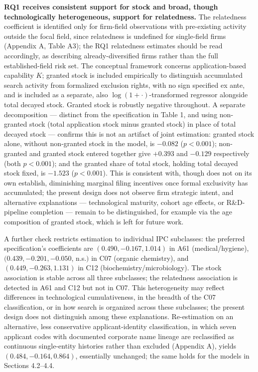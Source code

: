 \documentclass[12pt]{article}
\begin{document}
\textbf{RQ1 receives consistent support for stock and broad, though technologically heterogeneous, support for relatedness.} The relatedness coefficient is identified only for firm-field observations with pre-existing activity outside the focal field, since relatedness is undefined for single-field firms (Appendix A, Table A3); the RQ1 relatedness estimates should be read accordingly, as describing already-diversified firms rather than the full established-field risk set. The conceptual framework concerns application-based capability $K$; granted stock is included empirically to distinguish accumulated search activity from formalized exclusion rights, with no sign specified ex ante, and is included as a separate, also $\log(1+\cdot)$-transformed regressor alongside total decayed stock. Granted stock is robustly negative throughout. A separate decomposition --- distinct from the specification in Table 1, and using non-granted stock (total application stock minus granted stock) in place of total decayed stock --- confirms this is not an artifact of joint estimation: granted stock alone, without non-granted stock in the model, is $-0.082$ ($p<0.001$); non-granted and granted stock entered together give $+0.393$ and $-0.129$ respectively (both $p<0.001$); and the granted share of total stock, holding total decayed stock fixed, is $-1.523$ ($p<0.001$). This is consistent with, though does not on its own establish, diminishing marginal filing incentives once formal exclusivity has accumulated; the present design does not observe firm strategic intent, and alternative explanations --- technological maturity, cohort age effects, or R\&D-pipeline completion --- remain to be distinguished, for example via the age composition of granted stock, which is left for future work.

A further check restricts estimation to individual IPC subclasses: the preferred specification's coefficients are $(0.490,-0.167,1.014)$ in A61 (medical/hygiene), $(0.439,-0.201,-0.050$, n.s.$)$ in C07 (organic chemistry), and $(0.449,-0.263,1.131)$ in C12 (biochemistry/microbiology). The stock association is stable across all three subclasses; the relatedness association is detected in A61 and C12 but not in C07. This heterogeneity may reflect differences in technological cumulativeness, in the breadth of the C07 classification, or in how search is organized across these subclasses; the present design does not distinguish among these explanations. Re-estimation on an alternative, less conservative applicant-identity classification, in which seven applicant codes with documented corporate name lineage are reclassified as continuous single-entity histories rather than excluded (Appendix A), yields $(0.484,-0.164,0.864)$, essentially unchanged; the same holds for the models in Sections 4.2--4.4.
\end{document}
